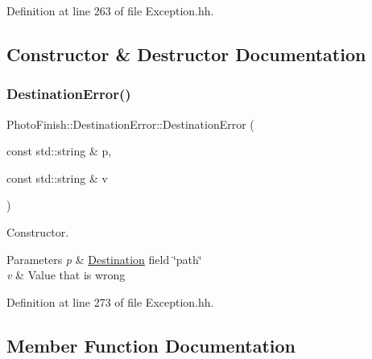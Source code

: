 Definition at line 263 of file Exception.\+hh.



\subsection{Constructor \& Destructor Documentation}
\mbox{\label{class_photo_finish_1_1_destination_error_a64bc7a5b20974a90fa479c0f2142977f}} 
\subsubsection{\texorpdfstring{Destination\+Error()}{DestinationError()}}
{\footnotesize\ttfamily Photo\+Finish\+::\+Destination\+Error\+::\+Destination\+Error (\begin{DoxyParamCaption}\item[{const std\+::string \&}]{p,  }\item[{const std\+::string \&}]{v }\end{DoxyParamCaption})\hspace{0.3cm}{\ttfamily [inline]}}



Constructor. 


\begin{DoxyParams}{Parameters}
{\em p} & \hyperlink{class_photo_finish_1_1_destination}{Destination} field \char`\"{}path\char`\"{} \\
\hline
{\em v} & Value that is wrong \\
\hline
\end{DoxyParams}


Definition at line 273 of file Exception.\+hh.



\subsection{Member Function Documentation}
\mbox{\label{class_photo_finish_1_1_destination_error_af1d3accc402e1a286d51896cf4f85449}} 
